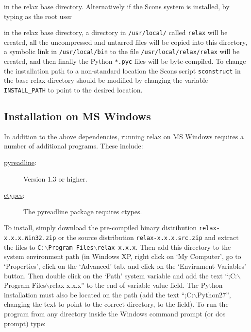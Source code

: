 in the relax base directory.  Alternatively if the Scons system is installed, by typing as the root user


in the relax base directory, a directory in \texttt{/usr/local/} called \texttt{relax} will be created, all the uncompressed and untarred files will be copied into this directory, a symbolic link in \texttt{/usr/local/bin} to the file \texttt{/usr/local/relax/relax} will be created, and then finally the Python \texttt{*.pyc} files will be byte-compiled.  To change the installation path to a non-standard location the Scons script \texttt{sconstruct} in the base relax directory should be modified by changing the variable \texttt{INSTALL\_PATH} to point to the desired location.



\subsection{Installation on MS Windows}

In addition to the above dependencies, running relax on MS Windows requires a number of additional programs.  These include:

\begin{description}
\item[\href{http://projects.scipy.org/ipython/ipython/wiki/PyReadline/Intro}{pyreadline}:]  Version 1.3 or higher.
\item[\href{http://starship.python.net/crew/theller/ctypes/}{ctypes}:]  The pyreadline package requires ctypes.
\end{description}

To install, simply download the pre-compiled binary distribution \texttt{relax-x.x.x.Win32.zip} or the source distribution \texttt{relax-x.x.x.src.zip} and extract the files to \texttt{C:$\backslash$Program Files$\backslash$relax-x.x.x}.  Then add this directory to the system environment path (in Windows XP, right click on `My Computer', go to `Properties', click on the `Advanced' tab, and click on the `Envirnment Variables' button.  Then double click on the `Path' system variable and add the text ``;C:$\backslash$Program Files$\backslash$relax-x.x.x'' to the end of variable value field.  The Python installation must also be located on the path (add the text ``;C:$\backslash$Python27'', changing the text to point to the correct directory, to the field).  To run the program from any directory inside the Windows command prompt (or dos prompt) type:

